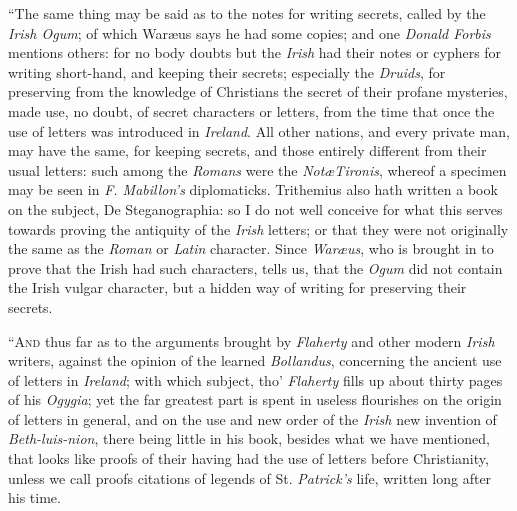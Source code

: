 \documentclass[11pt,oneside]{memoir}
\begin{document}
``The same thing may be said as to the notes for writing secrets, called by the \textit{Irish Ogum}; of which War{\ae}us says he had some copies; and one \textit{Donald Forbis} mentions others: for no body doubts but the \textit{Irish} had their notes or cyphers for writing short-hand, and keeping their secrets; especially the \textit{Druids}, for preserving from the knowledge of Christians the secret of their profane mysteries, made use, no doubt, of secret characters or letters, from the time that once the use of letters was introduced in \textit{Ireland}.
All other nations, and every private man, may have the same, for keeping secrets, and those entirely different from their usual letters: such among the \textit{Romans} were the \textit{Not\ae Tironis}, whereof a specimen may be seen in \textit{F. Mabillon's} diplomaticks.
Trithemius also hath written a book on the subject, De Steganographia: so I do not well conceive for what this serves towards proving the antiquity of the \textit{Irish} letters; or that they were not originally the same as the \textit{Roman} or \textit{Latin} character.
Since \textit{War{\ae}us}, who is brought in to prove that the Irish had such characters, tells us, that the \textit{Ogum} did not contain the Irish vulgar character, but a hidden way of writing for preserving their secrets. 

``\textsc{And} thus far as to the arguments brought by \textit{Flaherty} and other modern \textit{Irish} writers, against the opinion of the learned \textit{Bollandus}, concerning the ancient use of letters in \textit{Ireland}; with which subject, tho' \textit{Flaherty} fills up about thirty pages of his \textit{Ogygia}; yet the far greatest part is spent in useless flourishes on the origin of letters in general, and on the use and new order of the \textit{Irish} new invention of \textit{Beth-luis-nion}, there being little in his book, besides what we have mentioned, that looks like proofs of their having had the use of letters before Christianity, unless we call proofs citations of legends of St. \textit{Patrick's} life, written long after his time. 
\end{document}
